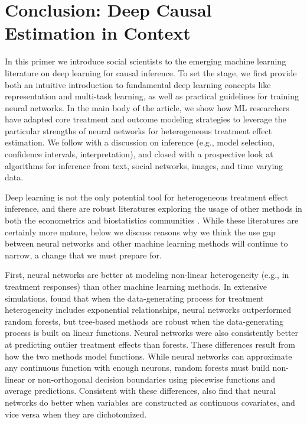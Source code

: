 \section{Conclusion: Deep Causal Estimation in Context}
\label{section:conclusions}

In this primer we introduce social scientists to the emerging machine learning literature on deep learning for causal inference. To set the stage, we first provide both an intuitive introduction to fundamental deep learning concepts like representation and multi-task learning, as well as practical guidelines for training neural networks. In the main body of the article, we show how ML researchers have adapted core treatment and outcome modeling strategies to leverage the particular strengths of neural networks for heterogeneous treatment effect estimation. We follow with a discussion on inference (e.g., model selection, confidence intervals, interpretation), and closed with a prospective look at algorithms for inference from text, social networks, images, and time varying data.

Deep learning is not the only potential tool for heterogeneous treatment effect inference, and there are robust literatures exploring the usage of other methods in both the econometrics and biostatistics communities \citep{van2011targeted,chernozhukov2016double,wager2018}. While these literatures are certainly more mature, below we discuss reasons why we think the use gap between neural networks and other machine learning methods will continue to narrow, a change that we must prepare for.
 
First, neural networks are better at modeling non-linear heterogeneity (e.g., in treatment responses) than other machine learning methods. In extensive simulations, \citet{curth2021} found that when the data-generating process for treatment heterogeneity includes exponential relationships, neural networks outperformed random forests, but tree-based methods are robust when the data-generating process is built on linear functions. Neural networks were also consistently better at predicting outlier treatment effects than forests. These differences result from how the two methods model functions. While neural networks can approximate any continuous function with enough neurons, random forests must build non-linear or non-orthogonal decision boundaries using piecewise functions and average predictions. Consistent with these differences, \citet{curth2021} also find that neural networks do better when variables are constructed as continuous covariates, and vice versa when they are dichotomized.  

